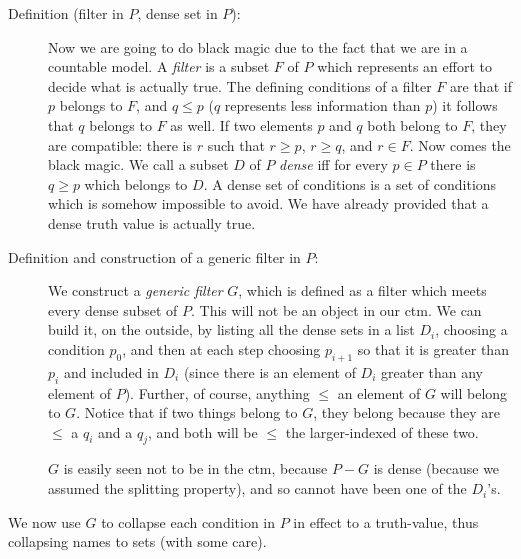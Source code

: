 \documentclass[12pt]{book}
\begin{document}
\begin{description}

\item[Definition (filter in $P$, dense set in $P$):]  Now we are going to do black magic due to the fact that we are in a countable model.  A {\em filter\/} is a subset  $F$ of $P$ which represents an effort to decide what is actually true.  The defining conditions of a filter $F$ are that if $p$ belongs to $F$, and $q \leq p$ ($q$ represents less information than $p$) it follows that
$q$ belongs to $F$ as well.  If two elements $p$ and $q$ both belong to $F$, they are compatible:  there is $r$ such that $r \geq p$, $r \geq q$, and $r \in F$.  Now comes the black magic.   We call a subset $D$ of $P$ {\em dense\/} iff for every $p \in P$ there is $q \geq p$ which belongs to $D$.
A dense set of conditions is a set of conditions which is somehow impossible to avoid.   We have already provided that a dense truth value is actually true.

\item[Definition and construction of a generic filter in $P$:]  We construct a {\em generic filter\/} $G$, which is defined as a filter which meets every dense subset of $P$.  This will not be an object in our ctm.
We can build it, on the outside, by listing all the dense sets in a list $D_i$, choosing a condition $p_0$, and then at each step choosing $p_{i+1}$ so that it is greater than $p_i$ and
included in $D_i$ (since there is an element of $D_i$ greater than any element of $P$).  Further, of course, anything $\leq$ an element of $G$ will belong to $G$.  Notice that if two things belong to $G$, they belong because they are $\leq$ a $q_i$ and a $q_j$, and both will be $\leq$
the larger-indexed of these two.

$G$ is easily seen not to be in the ctm, because $P - G$ is dense (because we assumed the splitting property), and so cannot have been one of the $D_i$'s.

\end{description}

We now use $G$ to collapse each condition in $P$ in effect to a truth-value, thus collapsing names to sets (with some care).
\end{document}
